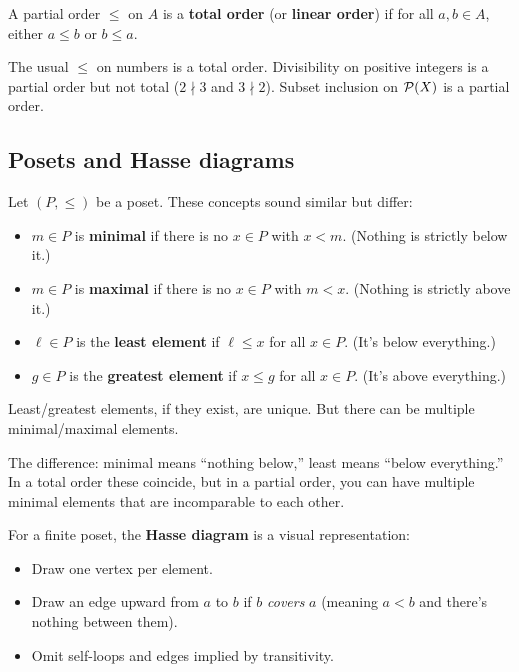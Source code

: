 \begin{definition}
A partial order $\leq$ on $A$ is a \textbf{total order} (or \textbf{linear order}) if for all $a, b \in A$, either $a \leq b$ or $b \leq a$.
\end{definition}

The usual $\leq$ on numbers is a total order. Divisibility on positive integers is a partial order but not total ($2 \nmid 3$ and $3 \nmid 2$). Subset inclusion on $\mathcal{P}(X)$ is a partial order.

\subsection*{Posets and Hasse diagrams}

\begin{definition}
Let $(P, \leq)$ be a poset. These concepts sound similar but differ:
\begin{itemize}
  \item $m \in P$ is \textbf{minimal} if there is no $x \in P$ with $x < m$. (Nothing is strictly below it.)
  \item $m \in P$ is \textbf{maximal} if there is no $x \in P$ with $m < x$. (Nothing is strictly above it.)
  \item $\ell \in P$ is the \textbf{least element} if $\ell \leq x$ for all $x \in P$. (It's below everything.)
  \item $g \in P$ is the \textbf{greatest element} if $x \leq g$ for all $x \in P$. (It's above everything.)
\end{itemize}
Least/greatest elements, if they exist, are unique. But there can be multiple minimal/maximal elements.
\end{definition}

The difference: minimal means ``nothing below,'' least means ``below everything.'' In a total order these coincide, but in a partial order, you can have multiple minimal elements that are incomparable to each other.

\begin{definition}
For a finite poset, the \textbf{Hasse diagram} is a visual representation:
\begin{itemize}
  \item Draw one vertex per element.
  \item Draw an edge upward from $a$ to $b$ if $b$ \emph{covers} $a$ (meaning $a < b$ and there's nothing between them).
  \item Omit self-loops and edges implied by transitivity.
\end{itemize}
\end{definition}

